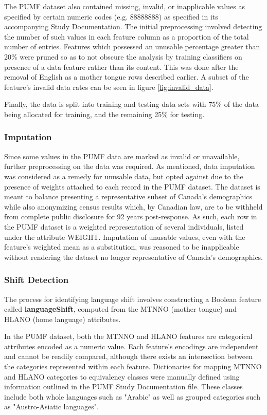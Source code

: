 \documentclass[10pt, conference, compsocconf]{IEEEtran}
\begin{document}
The PUMF dataset also contained missing, invalid, or inapplicable values as specified by certain numeric codes (e.g.  88888888) as specified in its accompanying Study Documentation.  The initial preprocessing involved detecting the number of such values in each feature column as a proportion of the total number of entries.  Features which possessed an unusable percentage greater than 20\% were pruned so as to not obscure the analysis by training classifiers on presence of a data feature rather than its content. This was done after the removal of English as a mother tongue rows described earlier. A subset of the feature's invalid data rates can be seen in figure \ref{fig:invalid_data}.

Finally, the data is split into training and testing data sets with 75\% of the data being allocated for training, and the remaining 25\% for testing.

\subsubsection{Imputation}
Since some values in the PUMF data are marked as invalid or unavailable, further preprocessing on the data was required.  As mentioned, data imputation was considered as a remedy for unusable data, but opted against due to the presence of weights attached to each record in the PUMF dataset.  The dataset is meant to balance presenting a representative subset of Canada's demographics while also anonymizing census results which, by Canadian law, are to be withheld from complete public disclosure for 92 years post-response.  As such, each row in the PUMF dataset is a weighted representation of several individuals, listed under the attribute WEIGHT.  Imputation of unusable values, even with the feature's weighted mean as a substitution, was reasoned to be inapplicable without rendering the dataset no longer representative of Canada's demographics.

\subsubsection{Shift Detection}
The process for identifying language shift involves constructing a Boolean feature called \textbf{languageShift}, computed from the MTNNO (mother tongue) and HLANO (home language) attributes.

In the PUMF dataset, both the MTNNO and HLANO features are categorical attributes encoded as a numeric value.  Each feature's encodings are independent and cannot be readily compared, although there exists an intersection between the categories represented within each feature.  Dictionaries for mapping MTNNO and HLANO categories to equivalency classes were manually defined using information outlined in the PUMF Study Documentation file.  These classes include both whole languages such as "Arabic" as well as grouped categories such as "Austro-Asiatic languages".
\end{document}
